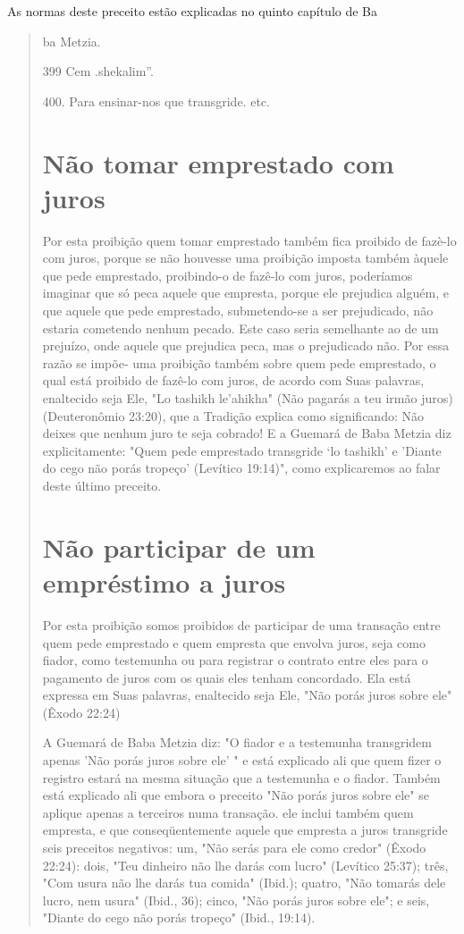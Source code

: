 As normas deste preceito estão explicadas no quinto capítulo de Ba

\begin{quote}
ba Metzia.

399 Cem .shekalim''.

400. Para ensinar-nos que transgride. etc.

\section{Não tomar emprestado com juros}

Por esta proibição quem tomar emprestado também fica proibido de fazè-lo
com juros, porque se não houvesse uma proibição imposta também àquele
que pede emprestado, proibindo-o de fazê-lo com juros, poderíamos
imaginar que só peca aquele que empresta, porque ele prejudica alguém, e
que aquele que pede emprestado, submetendo-se a ser prejudicado, não
estaria co­metendo nenhum pecado. Este caso seria semelhante ao de um
prejuízo, onde aquele que prejudica peca, mas o prejudicado não. Por
essa razão se impõe- uma proibição também sobre quem pede emprestado, o
qual está proibido de fazê-lo com juros, de acordo com Suas palavras,
enaltecido seja Ele, "Lo tashikh le'ahikha" (Não pagarás a teu irmão
juros) (Deuteronômio 23:20), que a Tradi­ção explica como significando:
Não deixes que nenhum juro te seja cobrado! E a Guemará de Baba Metzia
diz explicitamente: "Quem pede emprestado trans­gride `lo tashikh' e
'Diante do cego não porás tropeço' (Levítico 19:14)", como explicaremos
ao falar deste último preceito.

\section{Não participar de um empréstimo a juros}

Por esta proibição somos proibidos de participar de uma transação entre
quem pede emprestado e quem empresta que envolva juros, seja como
fiador, como testemunha ou para registrar o contrato entre eles para o
paga­mento de juros com os quais eles tenham concordado. Ela está
expressa em Suas palavras, enaltecido seja Ele, "Não porás juros sobre
ele" (Êxodo 22:24)

A Guemará de Baba Metzia diz: "O fiador e a testemunha transgri­dem
apenas 'Não porás juros sobre ele' " e está explicado ali que quem fizer
o registro estará na mesma situação que a testemunha e o fiador. Também
está explicado ali que embora o preceito "Não porás juros sobre ele" se
aplique apenas a terceiros numa transação. ele inclui também quem
empresta, e que conseqüentemente aquele que empresta a juros transgride
seis preceitos nega­tivos: um, "Não serás para ele como credor" (Êxodo
22:24): dois, "Teu dinhei­ro não lhe darás com lucro" (Levítico 25:37);
três, "Com usura não lhe darás tua comida" (Ibid.); quatro, "Não tomarás
dele lucro, nem usura" (Ibid., 36); cinco, "Não porás juros sobre ele";
e seis, "Diante do cego não porás tropeço" (Ibid., 19:14).


\end{quote}
